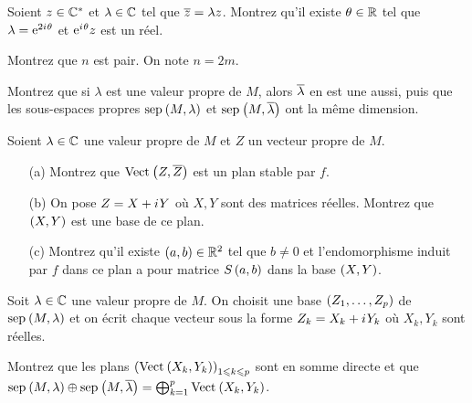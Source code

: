\begin{q}
Soient \(z\in\mathbb{C}^*\) et \(\lambda\in\mathbb{C}\) tel que \(\overline{z}=\lambda z\). Montrez qu'il existe \(\theta\in\mathbb{R}\) tel que \(\lambda=\mathrm{e}^{2i\mkern1mu\theta}\) et \(\mathrm{e}^{i\mkern1mu\theta}z\) est un réel.
\end{q}

\begin{corr}
\end{corr}

\begin{q}
Montrez que \(n\) est pair. On note \(n=2m\).
\end{q}

\begin{corr}
\end{corr}

\begin{q}
Montrez que si \(\lambda\) est une valeur propre de \(M\), alors \(\overline{\lambda}\) en est une aussi, puis que les sous-espaces propres \(\sep{M}{\lambda}\) et \(\sep{M}{\conj{\lambda}}\) ont la même dimension.
\end{q}

\begin{corr}
\end{corr}

\begin{q}
Soient \(\lambda\in\mathbb{C}\) une valeur propre de \(M\) et \(Z\) un vecteur propre de \(M\).

\begin{enumerate}
    \item[(a)] Montrez que \(\Vect{Z,\conj{Z}}\) est un plan stable par \(f\). \\
    \item[(b)] On pose \(Z=X+i\mkern1mu Y\) où \(X,Y\) sont des matrices réelles. Montrez que \(\left(X,Y\right)\) est une base de ce plan. \\
    \item[(c)] Montrez qu'il existe \(\left(a,b\right)\in\mathbb{R}^2\) tel que \(b\not=0\) et l'endomorphisme induit par \(f\) dans ce plan a pour matrice \(S\left(a,b\right)\) dans la base \(\left(X,Y\right)\).
\end{enumerate}
\end{q}

\begin{corr}
\end{corr}

\begin{q}
Soit \(\lambda\in\mathbb{C}\) une valeur propre de \(M\). On choisit une base \(\left(Z_1,\dots,Z_p\right)\) de \(\sep{M}{\lambda}\) et on écrit chaque vecteur sous la forme \(Z_k=X_k+i\mkern1mu Y_k\) où \(X_k,Y_k\) sont réelles.

Montrez que les plans \(\paren{\Vect{X_k,Y_k}}_{1\leq k\leq p}\) sont en somme directe et que \(\sep{M}{\lambda}\oplus\sep{M}{\conj{\lambda}}=\bigoplus_{k=1}^p\Vect{X_k,Y_k}\).
\end{q}

